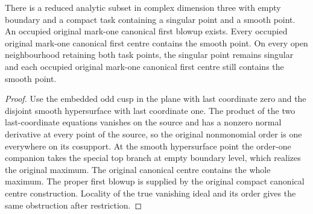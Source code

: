 \begin{theorem}
\label{hir:g8-original-mark-one-smooth-centre-obstruction}
\leanok
There is a reduced analytic subset in complex dimension three with
empty boundary and a compact task containing a singular point and
a smooth point. An occupied original mark-one canonical first
blowup exists. Every occupied original mark-one canonical first
centre contains the smooth point. On every open neighbourhood
retaining both task points, the singular point remains singular and
each occupied original mark-one canonical first centre still
contains the smooth point.
\end{theorem}
\begin{proof}
Use the embedded odd cusp in the plane with last coordinate zero
and the disjoint smooth hypersurface with last coordinate one.
The product of the two last-coordinate equations vanishes on the
source and has a nonzero normal derivative at every point of the
source, so the original nonmonomial order is one everywhere on
its cosupport. At the smooth hypersurface point the order-one
companion takes the special top branch at empty boundary level,
which realizes the original maximum. The original canonical
centre contains the whole maximum. The proper first blowup is
supplied by the original compact canonical centre construction.
Locality of the true vanishing ideal and its order gives the
same obstruction after restriction.
\end{proof}

